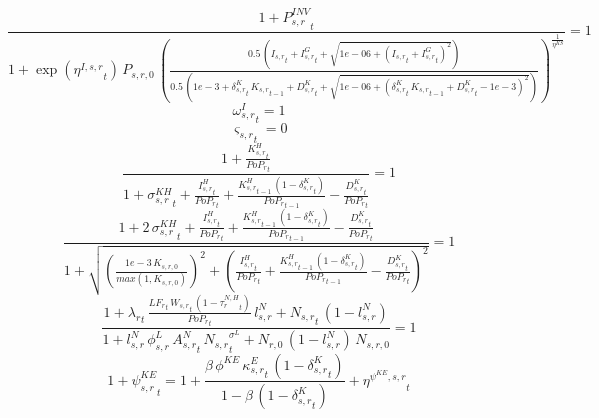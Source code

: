 \begin{dmath}
\frac{1+{{P^{INV}_{s,r}}}_{t}}{1+\exp\left({{\eta^{I,s,r}}}_{t}\right)\, {{P_{s,r,0}}}\, \left(\frac{0.5\, \left({{I_{s,r}}}_{t}+{{I^G_{s,r}}}_{t}+\sqrt{1e-06+\left({{I_{s,r}}}_{t}+{{I^G_{s,r}}}_{t}\right)^{2}}\right)}{0.5\, \left(1e-3+{{\delta^{K}_{s,r}}}_{t}\, {{K_{s,r}}}_{t-1}+{{D^K_{s,r}}}_{t}+\sqrt{1e-06+\left({{\delta^{K}_{s,r}}}_{t}\, {{K_{s,r}}}_{t-1}+{{D^K_{s,r}}}_{t}-1e-3\right)^{2}}\right)}\right)^{\frac{1}{{{\eta^{KS}}}}}}=1
\end{dmath}
\noindent[name= `HH FOC investment 2 1']
\begin{dmath}
{{\omega^I_{s,r}}}_{t}=1
\end{dmath}
\noindent[name= `HH capital scrapping 2 1']
\begin{dmath}
{{\varsigma_{s,r}}}_{t}=0
\end{dmath}
\noindent[name= `LOM capital 2 1']
\begin{dmath}
\frac{1+\frac{{{K^H_{s,r}}}_{t}}{{{PoP_r}}_{t}}}{1+{{\sigma^{KH}_{s,r}}}_{t}+\frac{{{I^H_{s,r}}}_{t}}{{{PoP_r}}_{t}}+\frac{{{K^H_{s,r}}}_{t-1}\, \left(1-{{\delta^{K}_{s,r}}}_{t}\right)}{{{PoP_r}}_{t-1}}-\frac{{{D^K_{s,r}}}_{t}}{{{PoP_r}}_{t}}}=1
\end{dmath}
\noindent[name= `Capital non-negativity slack 2 1']
\begin{dmath}
\frac{1+2\, {{\sigma^{KH}_{s,r}}}_{t}+\frac{{{I^H_{s,r}}}_{t}}{{{PoP_r}}_{t}}+\frac{{{K^H_{s,r}}}_{t-1}\, \left(1-{{\delta^{K}_{s,r}}}_{t}\right)}{{{PoP_r}}_{t-1}}-\frac{{{D^K_{s,r}}}_{t}}{{{PoP_r}}_{t}}}{1+\sqrt{\left(\frac{1e-3\, {{K_{s,r,0}}}}{max(1,{{K_{s,r,0}}})}\right)^{2}+\left(\frac{{{I^H_{s,r}}}_{t}}{{{PoP_r}}_{t}}+\frac{{{K^H_{s,r}}}_{t-1}\, \left(1-{{\delta^{K}_{s,r}}}_{t}\right)}{{{PoP_r}}_{t-1}}-\frac{{{D^K_{s,r}}}_{t}}{{{PoP_r}}_{t}}\right)^{2}}}=1
\end{dmath}
\noindent[name= `FOC labour supply 2 1']
\begin{dmath}
\frac{1+{\lambda_r}_{t}\, \frac{{{LF_r}}_{t}\, {{W_{s,r}}}_{t}\, \left(1-{{\tau^{N,H}_{r}}}_{t}\right)}{{{PoP_r}}_{t}}\, {{l^{N}_{s,r}}}+{{N_{s,r}}}_{t}\, \left(1-{{l^{N}_{s,r}}}\right)}{1+{{l^{N}_{s,r}}}\, {{\phi^{L}_{s,r}}}\, {{A^{N}_{s,r}}}_{t}\, {{N_{s,r}}}_{t}^{{{\sigma^{L}}}}+{{N_{r,0}}}\, \left(1-{{l^{N}_{s,r}}}\right)\, {{N_{s,r,0}}}}=1
\end{dmath}
\noindent[name= `SRI capital rental wedge 2 1']
\begin{dmath}
1+{{\psi^{KE}_{s,r}}}_{t}=1+\frac{{{\beta}}\, {{\phi^{KE}}}\, {{\kappa^{E}_{s,r}}}_{t}\, \left(1-{{\delta^{K}_{s,r}}}_{t}\right)}{1-{{\beta}}\, \left(1-{{\delta^{K}_{s,r}}}_{t}\right)}+{{\eta^{\psi^{KE},s,r}}}_{t}
\end{dmath}

